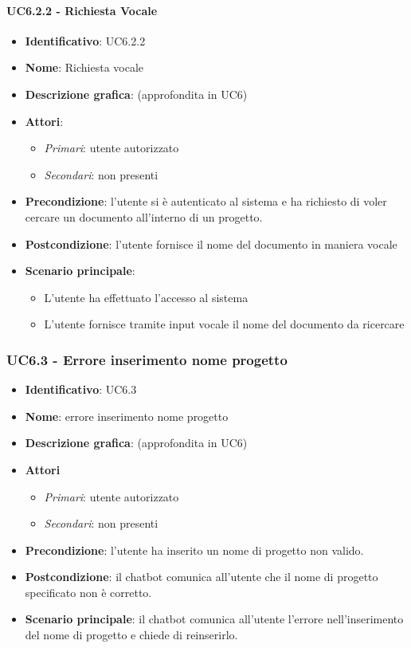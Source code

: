 \paragraph{UC6.2.2 - Richiesta Vocale}
\begin{itemize}
   \item \textbf{Identificativo}: UC6.2.2
   \item \textbf{Nome}: Richiesta vocale
   \item \textbf{Descrizione grafica}: (approfondita in UC6)
   \item \textbf{Attori}:
   \begin{itemize} 
       \item \textit{Primari}: utente autorizzato
       \item \textit{Secondari}: non presenti
   \end{itemize}
       \item \textbf{Precondizione}: l'utente si è autenticato al sistema e ha richiesto di voler cercare un documento all'interno di un progetto.
       \item \textbf{Postcondizione}: l'utente fornisce il nome del documento in maniera vocale
    \item \textbf{Scenario principale}: 
       \begin{itemize}
           \item L'utente ha effettuato l'accesso al sistema 
           \item L'utente fornisce tramite input vocale il nome del documento da ricercare
       \end{itemize}
\end{itemize}

\subsubsection{UC6.3 - Errore inserimento nome progetto}
\begin{itemize}
    \item \textbf{Identificativo}: UC6.3
    \item \textbf{Nome}: errore inserimento nome progetto
    \item \textbf{Descrizione grafica}: (approfondita in UC6)
    \item \textbf{Attori}
 \begin{itemize} 
    \item \textit{Primari}: utente autorizzato
    \item \textit{Secondari}: non presenti
 \end{itemize}
 \item \textbf{Precondizione}: l'utente ha inserito un nome di progetto non valido.
 \item \textbf{Postcondizione}:  il chatbot comunica all'utente che il nome di progetto specificato non è corretto.
 \item \textbf{Scenario principale}: il chatbot comunica all'utente l'errore nell'inserimento del nome di progetto e chiede di reinserirlo.
\end{itemize}
